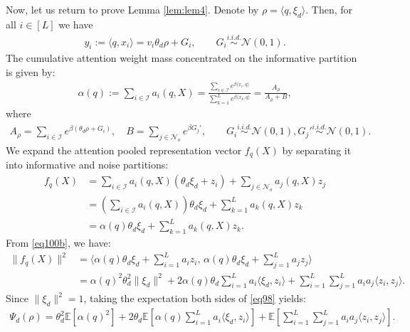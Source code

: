 \documentclass[11pt,a4paper]{article}
\theoremstyle{definition}
\begin{document}
Now, let us return to prove Lemma \ref{lem:lem4}. Denote by $\rho = \langle q, \xi_d \rangle$. Then, for all $i \in [L]$ we have
\begin{align}
y_i:=\langle q, x_i\rangle= v_i \theta_d \rho + G_i, \qquad G_i \overset{i.i.d.}{\sim} \mathcal{N}(0,1). 
\end{align}
The cumulative attention weight mass concentrated on the informative partition is given by:
\begin{align}
\alpha(q) := \sum_{i \in \mathcal{I}} a_i(q, X) = \frac{\sum_{i \in \mathcal{I}} e^{\beta \langle x_i, q \rangle}}{\sum_{k=1}^L e^{\beta \langle x_k, q \rangle}} = \frac{A_\rho}{A_\rho + B},
\end{align}
where
\begin{align}
A_\rho = \sum_{i \in \mathcal{I}} e^{\beta (\theta_d \rho + G_i)}, \quad B = \sum_{j \in \mathcal{N}_o} e^{\beta G_j'}, \qquad G_i \overset{i.i.d.}{\sim} \mathcal{N}(0,1), G_j' \overset{i.i.d.}{\sim} \mathcal{N}(0,1). 
\end{align}
We expand the attention pooled representation vector $f_q(X)$ by separating it into informative and noise partitions:
\begin{align}
f_q(X) &= \sum_{i \in \mathcal{I}} a_i(q, X) ( \theta_d \xi_d + z_i ) + \sum_{j \in \mathcal{N}_o} a_j(q, X) z_j \nonumber\\
&= \left( \sum_{i \in \mathcal{I}} a_i(q, X) \right) \theta_d \xi_d + \sum_{k=1}^L a_k(q, X) z_k \nonumber\\
&= \alpha(q) \theta_d \xi_d + \sum_{k=1}^L a_k(q, X) z_k \label{eq100b}. 
\end{align}
From \eqref{eq100b}, we have:
\begin{align}
\|f_q(X)\|^2 &= \langle \alpha(q) \theta_d \xi_d + \sum_{i=1}^L a_i z_i, \, \alpha(q) \theta_d \xi_d + \sum_{j=1}^L a_j z_j \rangle \nonumber\\
&= \alpha(q)^2 \theta_d^2 \|\xi_d\|^2 + 2 \alpha(q) \theta_d \sum_{i=1}^L a_i \langle \xi_d, z_i \rangle + \sum_{i=1}^L \sum_{j=1}^L a_i a_j \langle z_i, z_j \rangle \label{eq98}.
\end{align}
Since $\|\xi_d\|^2 = 1$, taking the expectation both sides of \eqref{eq98} yields:
\begin{align}
\Psi_d(\rho) = \theta_d^2 \mathbb{E}\left[ \alpha(q)^2 \right] + 2 \theta_d \mathbb{E}\left[ \alpha(q) \sum_{i=1}^L a_i \langle \xi_d, z_i \rangle \right] + \mathbb{E}\left[ \sum_{i=1}^L \sum_{j=1}^L a_i a_j \langle z_i, z_j \rangle \right] \label{eqAQ}.
\end{align}
\end{document}

